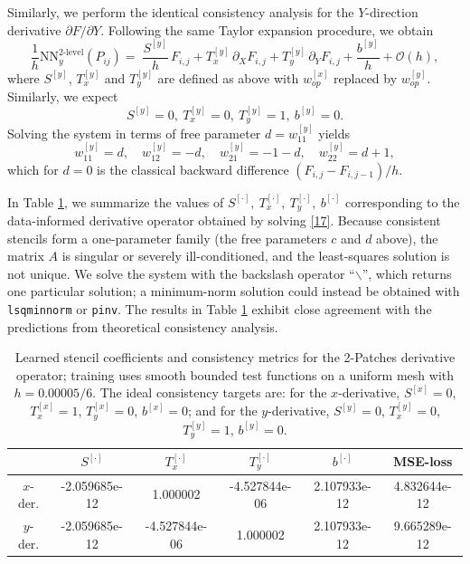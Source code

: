 \documentclass[pdflatex,sn-mathphys-num]{sn-jnl}%
\theoremstyle{thmstyleone}%
\theoremstyle{thmstyletwo}%
\theoremstyle{thmstylethree}%
\begin{document}
{Similarly, we perform the identical consistency analysis for the $Y$-direction derivative $\partial F/\partial Y$. Following the same Taylor expansion procedure, we obtain
\begin{equation}\label{eq:consistency_y}
\frac{1}{h}\mathrm{NN}^{2\text{-level}}_y(P_{ij})
=\;
\frac{S^{[y]}}{h}\,F_{i,j} 
+T_x^{[y]}\,\partial_X F_{i,j}
+T_y^{[y]}\,\partial_Y F_{i,j}
+\frac{b^{[y]}}{h}+\mathcal{O}(h),
\end{equation}
where $S^{[y]}$, $T_x^{[y]}$ and $T_y^{[y]}$ are defined as above with $w^{[x]}_{op}$ replaced by $w^{[y]}_{op}$. Similarly,  we expect
\[
S^{[y]}=0,\ T_x^{[y]}=0,\ T_y^{[y]}=1,\ b^{[y]}=0.
\]
Solving the system in terms of free parameter $d=w_{11}^{[y]}$ yields
\[
w_{11}^{[y]}=d,\quad w_{12}^{[y]}={-d},\quad w_{21}^{[y]}={-1-d},\quad w_{22}^{[y]}=d+1{,}
\]
which for $d=0$ is the classical backward difference $(F_{i,j}-F_{i,j-1})/h$.

In Table \ref{Tab:2}, we summarize the values of $S^{[\cdot]},\ T_x^{[\cdot]},\ T_y^{[\cdot]},\ b^{[\cdot]}$ corresponding to the data-informed derivative operator obtained by solving \eqref{17}. Because consistent stencils form a one-parameter family (the free parameters $c$ and $d$ above), the matrix $A$ is singular or severely ill-conditioned, and the least-squares solution is not unique. We solve the system with the backslash operator ``$\backslash$'', which returns one particular solution; a minimum-norm solution could instead be obtained with \texttt{lsqminnorm} or \texttt{pinv}. The results in Table \ref{Tab:2} exhibit close agreement with the predictions from theoretical consistency analysis.
\begin{table}[htbp]
\centering
\caption{Learned stencil coefficients and consistency metrics for the 2-Patches derivative operator; training uses smooth bounded test functions on a uniform mesh with $h=0.00005/6$. The ideal consistency targets are: for the $x$-derivative, $S^{[x]}=0$, $T_x^{[x]}=1$, $T_y^{[x]}=0$, $b^{[x]}= 0$; and for the $y$-derivative, $S^{[y]}=0$, $T_x^{[y]}=0$, $T_y^{[y]}=1$, $b^{[y]}= 0$.}
\label{Tab:2}
\begin{tabular}{c|cccc|c}
 &    $S^{[\cdot]}$ & $T_x^{[\cdot]}$ & $T_y^{[\cdot]}$ &$b^{[\cdot]}$ & MSE-loss \\
\hline
$x$-der. &-2.059685e-12  &  1.000002    & -4.527844e-06     & 2.107933e-12     & 4.832644e-12 \\
\hline
$y$-der. & -2.059685e-12 &     -4.527844e-06         & 1.000002   &   2.107933e-12&9.665289e-12 \\
\hline
\end{tabular}
\end{table}

}
\end{document}
